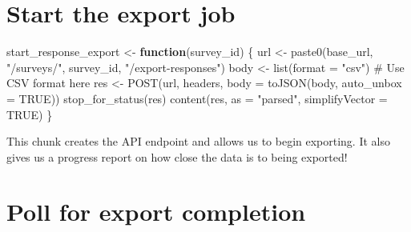 \documentclass[
  english,
  letterpaper,
  DIV=11,
  numbers=noendperiod]{scrreprt}
\newenvironment{Shaded}{\begin{snugshade}}{\end{snugshade}}
\newcommand{\AttributeTok}[1]{\textcolor[rgb]{0.40,0.45,0.13}{#1}}
\newcommand{\CommentTok}[1]{\textcolor[rgb]{0.37,0.37,0.37}{#1}}
\newcommand{\ConstantTok}[1]{\textcolor[rgb]{0.56,0.35,0.01}{#1}}
\newcommand{\ControlFlowTok}[1]{\textcolor[rgb]{0.00,0.23,0.31}{\textbf{#1}}}
\newcommand{\FunctionTok}[1]{\textcolor[rgb]{0.28,0.35,0.67}{#1}}
\newcommand{\NormalTok}[1]{\textcolor[rgb]{0.00,0.23,0.31}{#1}}
\newcommand{\OtherTok}[1]{\textcolor[rgb]{0.00,0.23,0.31}{#1}}
\newcommand{\StringTok}[1]{\textcolor[rgb]{0.13,0.47,0.30}{#1}}
\begin{document}
\section{Start the export job}\label{start-the-export-job}

\begin{Shaded}
\begin{Highlighting}[]
\NormalTok{start\_response\_export }\OtherTok{\textless{}{-}} \ControlFlowTok{function}\NormalTok{(survey\_id) \{}
\NormalTok{  url }\OtherTok{\textless{}{-}} \FunctionTok{paste0}\NormalTok{(base\_url, }\StringTok{"/surveys/"}\NormalTok{, survey\_id, }\StringTok{"/export{-}responses"}\NormalTok{)}
\NormalTok{  body }\OtherTok{\textless{}{-}} \FunctionTok{list}\NormalTok{(}\AttributeTok{format =} \StringTok{"csv"}\NormalTok{)  }\CommentTok{\# Use CSV format here}
\NormalTok{  res }\OtherTok{\textless{}{-}} \FunctionTok{POST}\NormalTok{(url, headers, }\AttributeTok{body =} \FunctionTok{toJSON}\NormalTok{(body, }\AttributeTok{auto\_unbox =} \ConstantTok{TRUE}\NormalTok{))}
  \FunctionTok{stop\_for\_status}\NormalTok{(res)}
  \FunctionTok{content}\NormalTok{(res, }\AttributeTok{as =} \StringTok{"parsed"}\NormalTok{, }\AttributeTok{simplifyVector =} \ConstantTok{TRUE}\NormalTok{)}
\NormalTok{\}}
\end{Highlighting}
\end{Shaded}

This chunk creates the API endpoint and allows us to begin exporting. It
also gives us a progress report on how close the data is to being
exported!

\section{Poll for export completion}\label{poll-for-export-completion}
\end{document}
